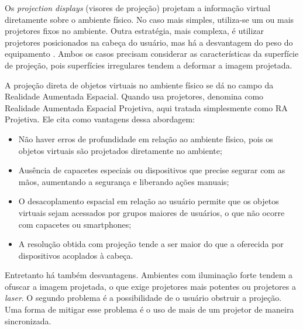 
Os \textit{projection displays} (visores de projeção) projetam a informação virtual diretamente sobre o ambiente físico. No caso mais simples, utiliza-se um ou mais projetores fixos no ambiente. Outra estratégia, mais complexa, é utilizar projetores posicionados na cabeça do usuário, mas há a desvantagem do peso do equipamento \cite{azuma_recent_2001}. Ambos os casos precisam considerar as características da superfície de projeção, pois superfícies irregulares tendem a deformar a imagem projetada.

A projeção direta de objetos virtuais no ambiente físico se dá no campo da Realidade Aumentada Espacial. Quando usa projetores,  denomina como Realidade Aumentada Espacial Projetiva, aqui tratada simplesmente como RA Projetiva. Ele cita como vantagens dessa abordagem:
\begin{itemize}
    \item Não haver erros de profundidade em relação ao ambiente físico, pois os objetos virtuais são projetados diretamente no ambiente;
    \item Ausência de capacetes especiais ou dispositivos que precise segurar com as mãos, aumentando a segurança e liberando ações manuais;
    \item O desacoplamento espacial em relação ao usuário permite que os objetos virtuais sejam acessados por grupos maiores de usuários, o que não ocorre com capacetes ou smartphones;
    \item A resolução obtida com projeção tende a ser maior do que a oferecida por dispositivos acoplados à cabeça.
\end{itemize}

Entretanto há também desvantagens. Ambientes com iluminação forte tendem a ofuscar a imagem projetada, o que exige projetores mais potentes ou projetores a \textit{laser}. O segundo problema é a possibilidade de o usuário obstruir a projeção. Uma forma de mitigar esse problema é o uso de mais de um projetor de maneira sincronizada.

